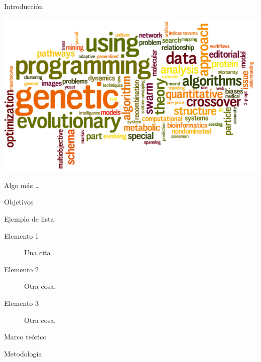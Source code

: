 \documentclass[a0paper, portrait]{baposter}
\begin{document}
\begin{poster}

  
  \begin{posterbox}[name=intro, column=0, row=0]{Introducci\'on} {
    \lipsum[18]
    
    \includegraphics[width=\linewidth]{wordle2.png}
    \label{fig:1}
    
    \vspace{1em} Algo m\'as \ldots %
  }
  \end{posterbox}

  \begin{posterbox}[name=tech, column=0, below=intro]{Objetivos} {
    Ejemplo de lista: \newline
    \begin{description}
    \item[Elemento 1] Una cita \cite{Charras}. 
    \item[Elemento 2] Otra cosa.
    \item[Elemento 3] Otra cosa.
    \end{description}
  }
  \end{posterbox}

  \begin{posterbox}[name=initial, column=0, below=tech]{Marco te\'orico} {
    
  }
  \end{posterbox}

  \begin{posterbox}[name=semantic, column=1, row=0]{Metodolog\'ia} {
    
  }
  \end{posterbox}
  

\end{poster}
\end{document}
